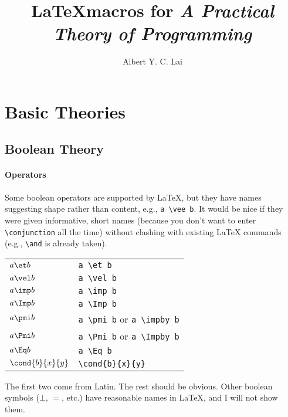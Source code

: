 \documentclass{article}
\title{\LaTeX macros for \emph{A Practical Theory of Programming}}
\author{Albert Y. C. Lai}
\begin{document}
\section{Basic Theories}

\subsection{Boolean Theory}

\paragraph{Operators}
Some boolean operators are supported by \LaTeX, but they have names
suggesting shape rather than content, e.g., \verb/a \vee b/.  It
would be nice if they were given informative, short names (because you
don't want to enter \verb/\conjunction/ all the time) without
clashing with existing \LaTeX{} commands (e.g., \verb/\and/ is already
taken).
\begin{center}
\begin{tabular}{ll}
$a \et b$ & \verb$a \et b$ \\
$a \vel b$ & \verb/a \vel b/ \\
$a \imp b$ & \verb/a \imp b/ \\
$a \Imp b$ & \verb$a \Imp b$ \\
$a \pmi b$ & \verb$a \pmi b$ or \verb$a \impby b$ \\
$a \Pmi b$ & \verb$a \Pmi b$ or \verb$a \Impby b$ \\
$a \Eq b$ & \verb$a \Eq b$ \\
$\cond{b}{x}{y}$ & \verb$\cond{b}{x}{y}$
\end{tabular}
\end{center}
The first two come from Latin.  The rest should be obvious.  Other
boolean symbols ($\bot$, $=$, etc.) have reasonable names in \LaTeX, and I
will not show them.
\end{document}
